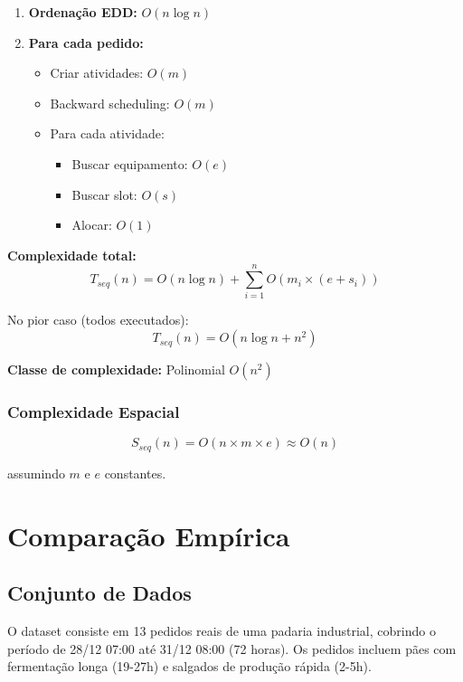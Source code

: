 \documentclass[11pt,a4paper]{article}
\begin{document}
\begin{enumerate}
    \item \textbf{Ordenação EDD:} $O(n \log n)$
    \item \textbf{Para cada pedido:}
    \begin{itemize}
        \item Criar atividades: $O(m)$
        \item Backward scheduling: $O(m)$
        \item Para cada atividade:
        \begin{itemize}
            \item Buscar equipamento: $O(e)$
            \item Buscar slot: $O(s)$
            \item Alocar: $O(1)$
        \end{itemize}
    \end{itemize}
\end{enumerate}

\textbf{Complexidade total:}
\begin{equation}
T_{seq}(n) = O(n \log n) + \sum_{i=1}^{n} O(m_i \times (e + s_i))
\end{equation}

No pior caso (todos executados):
\begin{equation}
T_{seq}(n) = O(n \log n + n^2)
\end{equation}

\textbf{Classe de complexidade:} Polinomial $O(n^2)$

\subsubsection{Complexidade Espacial}

\begin{equation}
S_{seq}(n) = O(n \times m \times e) \approx O(n)
\end{equation}

assumindo $m$ e $e$ constantes.

\section{Comparação Empírica}

\subsection{Conjunto de Dados}

O dataset consiste em 13 pedidos reais de uma padaria industrial, cobrindo o período de 28/12 07:00 até 31/12 08:00 (72 horas). Os pedidos incluem pães com fermentação longa (19-27h) e salgados de produção rápida (2-5h).
\end{document}
